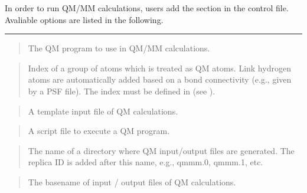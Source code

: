 \documentclass[a4paper,11pt,oneside,english]{sphinxmanual}
\begin{document}
In order to run QM/MM calculations, users add the \sphinxstylestrong{{[}QMMM{]}} section
in the control file. Avaliable options are listed in the following.


\bigskip\hrule\bigskip


 
\begin{quote}

The QM program to use in QM/MM calculations.
\end{quote}

 
\begin{quote}

Index of a group of atoms which is treated as QM atoms.
Link hydrogen atoms are automatically added based on a
bond connectivity (e.g., given by a PSF file). The index
must be defined in \sphinxstylestrong{{[}SELECTION{]}} (see {\hyperref[\detokenize{11_Selection:selection}]{}}).
\end{quote}

  
\begin{quote}

A template input file of QM calculations.
\end{quote}

 
\begin{quote}

A script file to execute a QM program.
\end{quote}

 
\begin{quote}


The name of a directory where QM input/output files are generated.
The replica ID is added after this name, e.g., qmmm.0, qmmm.1, etc.
\end{quote}

 
\begin{quote}


The basename of input / output files of QM calculations.
\end{quote}
\end{document}
